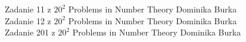 
 Zadanie 11 z $20^2$ Problems in Number Theory Dominika Burka \\
 Zadanie 12 z $20^2$ Problems in Number Theory Dominika Burka \\
 Zadanie 201 z $20^2$ Problems in Number Theory Dominika Burka \\